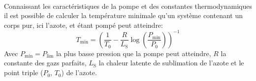 \\
Connaissant les caractéristiques de la pompe et des constantes thermodynamiques il est possible de calculer la température minimale qu'un système contenant un corps pur, ici l'azote, et étant pompé peut atteindre:
\begin{equation}
    T_\textrm{min} = (\frac{1}{T_\textrm{0}} - \frac{R}{L_\textrm{S}}\log(\frac{P_\textrm{min}}{P_\textrm{0}}))^{-1}
    \label{eq:Tmin}
\end{equation}
Avec \(P_\textrm{min} = P_\textrm{lim}\) la plus basse pression que la pompe peut atteindre, \(R\) la constante des gazs parfaits, \(L_\textrm{S}\) la chaleur latente de sublimation de l'azote et le point triple (\(P_\textrm{0}\), \(T_\textrm{0}\)) de l'azote. 
